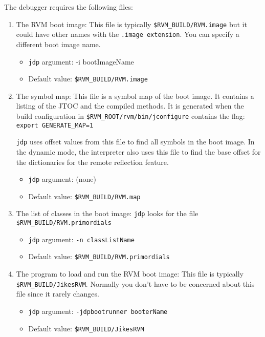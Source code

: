 The debugger requires the following files:

\begin{enumerate}
\item The RVM boot image:
   This file is typically {\tt \$RVM\_BUILD/RVM.image} but it could
   have other names with the {\tt .image extension}.  You can specify a
   different boot image name.
\begin{itemize}
\item    {\tt jdp} argument:    {-i bootImageName}
\item   Default value:          {\tt \$RVM\_BUILD/RVM.image}
\end{itemize}

\item The symbol map:
   This file is a symbol map of the boot image.  It contains a listing of the 
   JTOC and the compiled methods.  It is generated when the build configuration 
   in {\tt \$RVM\_ROOT/rvm/bin/jconfigure} contains the flag:
        {\tt export GENERATE\_MAP=1}

   {\tt jdp} uses offset 
   values from this file to find all symbols in the boot image.
   In the dynamic mode, the interpreter also uses this file to find the base 
   offset for the dictionaries for the remote reflection feature.
\begin{itemize}
\item   {\tt jdp} argument:     (none)
\item    Default value: {\tt \$RVM\_BUILD/RVM.map}
\end{itemize}

\item The list of classes in the boot image:
   {\tt jdp} looks for the file {\tt \$RVM\_BUILD/RVM.primordials}

\begin{itemize}
\item   {\tt jdp} argument:     {\tt -n classListName}
\item   Default value:  {\tt \$RVM\_BUILD/RVM.primordials}
\end{itemize}

\item The program to load and run the RVM boot image:
   This file is typically {\tt \$RVM\_BUILD/JikesRVM}.
   Normally you don't have to be concerned about this file since it rarely
   changes.
\begin{itemize}
\item   {\tt jdp} argument:     {\tt -jdpbootrunner booterName}
\item   Default value:  {\tt \$RVM\_BUILD/JikesRVM}
\end{itemize}
\end{enumerate}

